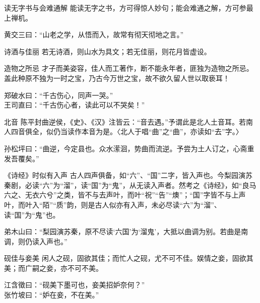 \begin{yulu}{读无字书与会难通解}
能读无字之书，方可得惊人妙句；能会难通之解，方可参最上禅机。
\begin{comments}
黄交三曰：“山老之学，从悟而入，故常有彻天彻地之言。”
\end{comments}
\end{yulu}

\begin{yulu}{诗酒与佳丽}
若无诗酒，则山水为具文；若无佳丽，则花月皆虚设。
\begin{comments}

\end{comments}
\end{yulu}

\begin{yulu}{造物之所忌}
才子而美姿容，佳人而工著作，断不能永年者，匪独为造物之所忌。盖此种原不独为一时之宝，乃古今万世之宝，故不欲久留人世以取亵耳！
\begin{comments}
郑破水曰：“千古伤心，同声一哭。” \\
王司直曰：“千古伤心者，读此可以不哭矣！”
\end{comments}
\end{yulu}

\begin{yulu}{北音}
陈平封曲逆侯，《史》、《汉》注皆云：“音去遇。”予谓此是北人土音耳。若南人四音俱全，似仍当读作本音为是。〈北人于唱“曲”之“曲”，亦读如“去”字。〉
\begin{comments}
孙松坪曰：“曲逆，今定县也。众水潆洄，势曲而流逆。予尝为土人订之，心斋重发吾覆矣。”
\end{comments}
\end{yulu}

\begin{yulu}{《诗经》时似有入声}
古人四声俱备，如“六”、“国”二字，皆入声也。今梨园演苏秦剧，必读“六”为“溜”，读“国”为“鬼”，从无读入声者。然考之《诗经》，如“良马六之、无衣六兮”之类，皆不与去声叶，而叶“祝”“告”“燠”；“国”字皆不与上声叶，而叶入“陌”“质”韵，则是古人似亦有入声，未必尽读“六”为“溜”、读“国”为“鬼”也。
\begin{comments}
弟木山曰：“梨园演苏秦，原不尽读‘六国’为‘溜鬼’，大抵以曲调为别。若曲是南调，则仍读入声也。”
\end{comments}
\end{yulu}

\begin{yulu}{砚佳与妾美}
闲人之砚，固欲其佳；而忙人之砚，尤不可不佳。娱情之妾，固欲其美；而广嗣之妾，亦不可不美。
\begin{comments}
江含徵曰：“砚美下墨可也，妾美招妒奈何？” \\
张竹坡曰：“妒在妾，不在美。”
\end{comments}
\end{yulu}

